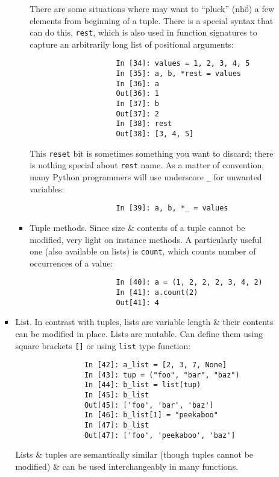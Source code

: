 \documentclass{article}
\begin{document}
\begin{itemize}
\begin{itemize}
\begin{itemize}
\begin{itemize}
				There are some situations where may want to ``pluck'' (nhổ) a few elements from beginning of a tuple. There is a special syntax that can do this, {\tt*rest}, which is also used in function signatures to capture an arbitrarily long list of positional arguments:
				\begin{verbatim}
					In [34]: values = 1, 2, 3, 4, 5
					In [35]: a, b, *rest = values
					In [36]: a
					Out[36]: 1
					In [37]: b
					Out[37]: 2
					In [38]: rest
					Out[38]: [3, 4, 5]
				\end{verbatim}
				This {\tt reset} bit is sometimes something you want to discard; there is nothing special about {\tt rest} name. As a matter of convention, many Python programmers will use underscore \verb|_| for unwanted variables:
				\begin{verbatim}
					In [39]: a, b, *_ = values
				\end{verbatim}
				\item {\sf Tuple methods.}  Since size \& contents of a tuple cannot be modified, very light on instance methods. A particularly useful one (also available on lists) is {\tt count}, which counts number of occurrences of a value:
				\begin{verbatim}
					In [40]: a = (1, 2, 2, 2, 3, 4, 2)
					In [41]: a.count(2)
					Out[41]: 4
				\end{verbatim}
			\end{itemize}
			\item {\sf List.} In contrast with tuples, lists are variable length \& their contents can be modified in place. Lists are mutable. Can define them using square brackets {\tt[]} or using {\tt list} type function:
			\begin{verbatim}
				In [42]: a_list = [2, 3, 7, None]
				In [43]: tup = ("foo", "bar", "baz")
				In [44]: b_list = list(tup)
				In [45]: b_list
				Out[45]: ['foo', 'bar', 'baz']
				In [46]: b_list[1] = "peekaboo"
				In [47]: b_list
				Out[47]: ['foo', 'peekaboo', 'baz']
			\end{verbatim}
			Lists \& tuples are semantically similar (though tuples cannot be modified) \& can be used interchangeably in many functions.
			

\end{itemize}
\end{itemize}
\end{itemize}
\end{document}
